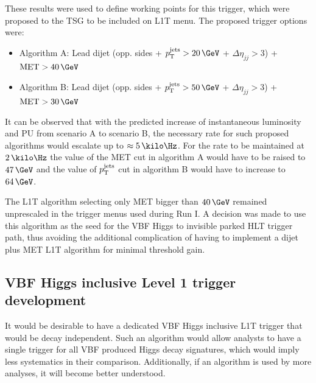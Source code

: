 These results were used to define working points for this trigger, which were proposed to the \gls{TSG} to be included on \gls{L1T} menu. The proposed trigger options were:
\begin{itemize}
\item Algorithm A: Lead dijet (opp. sides + $\pt^{\text{jets}}>20\,\GeV$ + $\Delta\eta_{jj}>3$) + $\text{MET}>40\,\GeV$
\item Algorithm B: Lead dijet (opp. sides + $\pt^{\text{jets}}>50\,\GeV$ + $\Delta\eta_{jj}>3$) + $\text{MET}>30\,\GeV$
\end{itemize}

It can be observed that with the predicted increase of instantaneous luminosity and \gls{PU} from scenario A to scenario B, the necessary rate for such proposed algorithms would escalate up to $\approx 5\,\kilo\Hz$. For the rate to be maintained at $2\,\kilo\Hz$ the value of the MET cut in algorithm A would have to be raised to $47\,\GeV$ and the value of $p_{\mathrm{T}}^{\text{jets}}$ cut in algorithm B would have to increase to $64\,\GeV$.

The \gls{L1T} algorithm selecting only \gls{MET} bigger than $40\,\GeV$ remained unprescaled in the trigger menus used during Run I. A decision was made to use this algorithm as the seed for the \gls{VBF} Higgs to invisible parked \gls{HLT} trigger path, thus avoiding the additional complication of having to implement a dijet plus \gls{MET} \gls{L1T} algorithm for minimal threshold gain.

\subsection{VBF Higgs inclusive Level 1 trigger development}
\label{SUBSECTION:ParkedDataAnalysis_ParkedTriggerDevelopment_InclusiveHiggsTrigger}


It would be desirable to have a dedicated \gls{VBF} Higgs inclusive \gls{L1T} trigger that would be decay independent. Such an algorithm would allow analysts to have a single trigger for all \gls{VBF} produced Higgs decay signatures, which would imply less systematics in their comparison. Additionally, if an algorithm is used by more analyses, it will become better understood.

